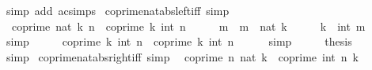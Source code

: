 \begin{isabellebody}
\ {\isacharparenleft}{\kern0pt}simp\ add{\isacharcolon}{\kern0pt}\ ac{\isacharunderscore}{\kern0pt}simps{\isacharparenright}{\kern0pt}%
\endisatagproof
{\isafoldproof}%
%
\isadelimproof
\isanewline
%
\endisadelimproof
\isanewline
{}\isamarkupfalse%
\ coprime{\isacharunderscore}{\kern0pt}nat{\isacharunderscore}{\kern0pt}abs{\isacharunderscore}{\kern0pt}left{\isacharunderscore}{\kern0pt}iff\ {\isacharbrackleft}{\kern0pt}simp{\isacharbrackright}{\kern0pt}{\isacharcolon}{\kern0pt}\isanewline
\ \ {\isachardoublequoteopen}coprime\ {\isacharparenleft}{\kern0pt}nat\ {\isasymbar}k{\isasymbar}{\isacharparenright}{\kern0pt}\ n\ {\isasymlongleftrightarrow}\ coprime\ k\ {\isacharparenleft}{\kern0pt}int\ n{\isacharparenright}{\kern0pt}{\isachardoublequoteclose}\isanewline
%
\isadelimproof
%
\endisadelimproof
%
\isatagproof
{}\isamarkupfalse%
\ {\isacharminus}{\kern0pt}\isanewline
\ \ \isamarkupfalse%
\ m\ \ {\isachardoublequoteopen}m\ {\isacharequal}{\kern0pt}\ nat\ {\isasymbar}k{\isasymbar}{\isachardoublequoteclose}\isanewline
\ \ \isamarkupfalse%
\ \isamarkupfalse%
\ {\isachardoublequoteopen}{\isasymbar}k{\isasymbar}\ {\isacharequal}{\kern0pt}\ int\ m{\isachardoublequoteclose}\isanewline
\ \ \ \ \isamarkupfalse%
\ simp\isanewline
\ \ \isamarkupfalse%
\ \isamarkupfalse%
\ {\isachardoublequoteopen}coprime\ k\ {\isacharparenleft}{\kern0pt}int\ n{\isacharparenright}{\kern0pt}\ {\isasymlongleftrightarrow}\ coprime\ {\isasymbar}k{\isasymbar}\ {\isacharparenleft}{\kern0pt}int\ n{\isacharparenright}{\kern0pt}{\isachardoublequoteclose}\isanewline
\ \ \ \ \isamarkupfalse%
\ simp\isanewline
\ \ \isamarkupfalse%
\ \isamarkupfalse%
\ {\isacharquery}{\kern0pt}thesis\isanewline
\ \ \ \ \isamarkupfalse%
\ simp\isanewline
{}\isamarkupfalse%
%
\endisatagproof
{\isafoldproof}%
%
\isadelimproof
\isanewline
%
\endisadelimproof
\isanewline
{}\isamarkupfalse%
\ coprime{\isacharunderscore}{\kern0pt}nat{\isacharunderscore}{\kern0pt}abs{\isacharunderscore}{\kern0pt}right{\isacharunderscore}{\kern0pt}iff\ {\isacharbrackleft}{\kern0pt}simp{\isacharbrackright}{\kern0pt}{\isacharcolon}{\kern0pt}\isanewline
\ \ {\isachardoublequoteopen}coprime\ n\ {\isacharparenleft}{\kern0pt}nat\ {\isasymbar}k{\isasymbar}{\isacharparenright}{\kern0pt}\ {\isasymlongleftrightarrow}\ coprime\ {\isacharparenleft}{\kern0pt}int\ n{\isacharparenright}{\kern0pt}\ k{\isachardoublequoteclose}\isanewline

\end{isabellebody}
